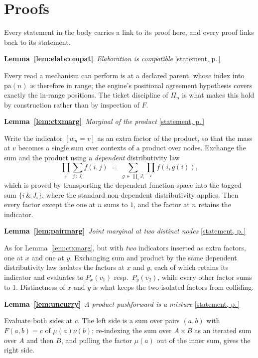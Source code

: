 \documentclass[11pt,a4paper]{article}
\theoremstyle{definition}
\theoremstyle{plain}
\theoremstyle{remark}
\newcommand{\pa}{\mathrm{pa}}
\newcommand{\pv}{\Pi}                  %
\newenvironment{proofof}[3]{%
  \par\medskip\phantomsection\label{pf:#1}%
  \noindent\textbf{#2~\ref{#1}}\ \emph{#3}\quad
  \hyperref[#1]{\small[statement, p.\,\pageref{#1}]}\par\nobreak
  \noindent\ignorespaces}{\par}
\begin{document}
\appendix
\section{Proofs}
\label{sec:proofs}

Every statement in the body carries a link to its proof here, and every
proof links back to its statement.

\begin{proofof}{lem:elabcompat}{Lemma}{Elaboration is compatible}
Every read a mechanism can perform is at a declared parent, whose index
into $\pa(n)$ is therefore in range; the engine's positional agreement
hypothesis covers exactly the in-range positions. The ticket discipline of
$\pv_n$ is what makes this hold by construction rather than by inspection
of $F$.
\end{proofof}

\begin{proofof}{lem:ctxmarg}{Lemma}{Marginal of the product}
Write the indicator $[w_n = v]$ as an extra factor of the product, so that
the mass at $v$ becomes a single sum over contexts of a product over nodes.
Exchange the sum and the product using a \emph{dependent} distributivity
law
\[
  \prod_{i} \sum_{j\,:\,J_i} f(i,j)
  \;=\;
  \sum_{g \,\in\, \prod_i J_i} \prod_i f(i, g(i)),
\]
which is proved by transporting the dependent function space into the
tagged sum $\{i\,\&\,J_i\}$, where the standard non-dependent
distributivity applies. Then every factor except the one at $n$ sums to
$1$, and the factor at $n$ retains the indicator.
\end{proofof}

\begin{proofof}{lem:pairmarg}{Lemma}{Joint marginal at two distinct nodes}
As for Lemma~\ref{lem:ctxmarg}, but with \emph{two} indicators inserted as
extra factors, one at $x$ and one at $y$. Exchanging sum and product by the
same dependent distributivity law isolates the factors at $x$ and $y$, each
of which retains its indicator and evaluates to $P_x(v_1)$ resp.\
$P_y(v_2)$, while every other factor sums to $1$. Distinctness of $x$ and
$y$ is what keeps the two isolated factors from colliding.
\end{proofof}

\begin{proofof}{lem:uncurry}{Lemma}{A product pushforward is a mixture}
Evaluate both sides at $c$. The left side is a sum over pairs
$(a,b)$ with $F(a,b) = c$ of $\mu(a)\nu(b)$; re-indexing the sum over
$A \times B$ as an iterated sum over $A$ and then $B$, and pulling the
factor $\mu(a)$ out of the inner sum, gives the right side.
\end{proofof}
\end{document}
